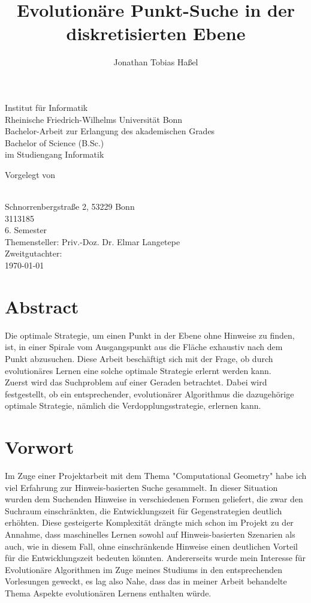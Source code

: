 \documentclass[12pt,a4paper,oneside]{article}
\title{Evolutionäre Punkt-Suche in der diskretisierten Ebene}
\author{Jonathan Tobias Haßel}
\begin{document}
\begin{titlepage}
	\centering
	{\LARGE Institut für Informatik\\Rheinische Friedrich-Wilhelms Universität Bonn\\}
	\vspace{2cm}
	{\large Bachelor-Arbeit zur Erlangung des akademischen Grades\\
	\vspace{.5cm}
	Bachelor of Science (B.Sc.)\\
	\vspace{.5cm}
	im Studiengang Informatik\\}
	\vfill
	{\huge\thetitle\par}
	\vfill
	Vorgelegt von\\
	\vspace{1cm}
	\raggedright
	\theauthor\\
	Schnorrenbergstraße 2, 53229 Bonn\\
	3113185\\
	6. Semester\\
	\vspace{1cm}
	Themensteller: Priv.-Doz. Dr. Elmar Langetepe\\
    Zweitgutachter:  \\
    \vspace{.5cm}
    \centering
    \today
\end{titlepage}

\section{Abstract}
Die optimale Strategie, um einen Punkt in der Ebene ohne Hinweise zu finden, ist, in einer Spirale vom Ausgangspunkt aus die Fläche exhaustiv nach dem Punkt abzusuchen. Diese Arbeit beschäftigt sich mit der Frage, ob durch evolutionäres Lernen eine solche optimale Strategie erlernt werden kann.\\
Zuerst wird das Suchproblem auf einer Geraden betrachtet. Dabei wird festgestellt, ob ein entsprechender, evolutionärer Algorithmus die dazugehörige optimale Strategie, nämlich die Verdopplungsstrategie, erlernen kann.

\section{Vorwort}
Im Zuge einer Projektarbeit mit dem Thema "Computational Geometry" habe ich viel Erfahrung zur Hinweis-basierten Suche gesammelt. In dieser Situation wurden dem Suchenden Hinweise in verschiedenen Formen geliefert, die zwar den Suchraum einschränkten, die Entwicklungszeit für Gegenstrategien deutlich erhöhten. Diese gesteigerte Komplexität drängte mich schon im Projekt zu der Annahme, dass maschinelles Lernen sowohl auf Hinweis-basierten Szenarien als auch, wie in diesem Fall, ohne einschränkende Hinweise einen deutlichen Vorteil für die Entwicklungszeit bedeuten könnten.
Andererseits wurde mein Interesse für Evolutionäre Algorithmen im Zuge meines Studiums in den entsprechenden Vorlesungen geweckt, es lag also Nahe, dass das in meiner Arbeit behandelte Thema Aspekte evolutionären Lernens enthalten würde.
\end{document}
